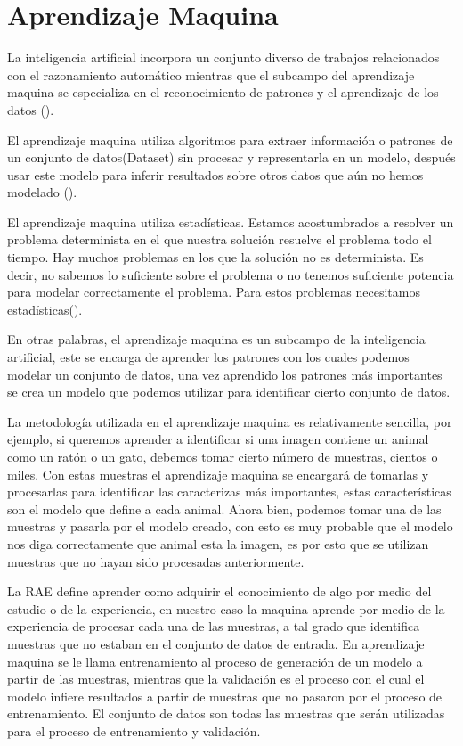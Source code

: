 \section{Aprendizaje Maquina}
\label{sec:MachineLearning}

La inteligencia artificial incorpora un conjunto diverso de trabajos relacionados con el razonamiento automático mientras que el subcampo del aprendizaje maquina se especializa en el reconocimiento de patrones y el aprendizaje de los datos (\cite{rosebrock2017deep}).

El aprendizaje maquina utiliza algoritmos para extraer información o patrones de un conjunto de datos(Dataset) sin procesar y representarla en un modelo, después usar este modelo para inferir resultados sobre otros datos que aún no hemos modelado (\cite{patterson2017deep}).

El aprendizaje maquina utiliza estadísticas. Estamos acostumbrados a resolver un problema determinista en el que nuestra solución resuelve el problema todo el tiempo. Hay muchos problemas en los que la solución no es determinista. Es decir, no sabemos lo suficiente sobre el problema o no tenemos suficiente potencia para modelar correctamente el problema. Para estos problemas necesitamos estadísticas(\cite{harrington2012Machine}).

En otras palabras, el aprendizaje maquina es un subcampo de la inteligencia artificial, este se encarga de aprender los patrones con los cuales podemos modelar un conjunto de datos, una vez aprendido los patrones más importantes se crea un modelo que podemos utilizar para identificar cierto conjunto de datos.

La metodología utilizada en el aprendizaje maquina es relativamente sencilla, por ejemplo, si queremos aprender a identificar si una imagen contiene un animal como un ratón o un gato, debemos tomar cierto número de muestras, cientos o miles. Con estas muestras el aprendizaje maquina se encargará de tomarlas y procesarlas para identificar las caracterizas más importantes, estas características son el modelo que define a cada animal. Ahora bien, podemos tomar una de las muestras y pasarla por el modelo creado, con esto es muy probable que el modelo nos diga correctamente que animal esta la imagen, es por esto que se utilizan muestras que no hayan sido procesadas anteriormente.

La RAE define aprender como adquirir el conocimiento de algo por medio del estudio o de la experiencia, en nuestro caso la maquina aprende por medio de la experiencia de procesar cada una de las muestras, a tal grado que identifica muestras que no estaban en el conjunto de datos de entrada. En aprendizaje maquina se le llama entrenamiento al proceso de generación de un modelo a partir de las muestras, mientras que la validación es el proceso con el cual el modelo infiere resultados a partir de muestras que no pasaron por el proceso de entrenamiento. El conjunto de datos son todas las muestras que serán utilizadas para el proceso de entrenamiento y validación.

